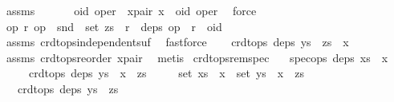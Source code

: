 \begin{isabellebody}
%
\isadelimproof
%
\endisadelimproof
%
\isatagproof
{}\isamarkupfalse%
\ assms\ \isamarkupfalse%
\ {\isacharminus}\isanewline
\ \ \isamarkupfalse%
\ oid\ oper\ \ x{\isacharunderscore}pair{\isacharcolon}\ {\isachardoublequoteopen}x\ {\isacharequal}\ {\isacharparenleft}oid{\isacharcomma}\ oper{\isacharparenright}{\isachardoublequoteclose}\ \isamarkupfalse%
\ force\isanewline
\ \ \isamarkupfalse%
\ {\isachardoublequoteopen}{\isasymAnd}op{}\ r{\isachardot}\ op{}\ {\isasymin}\ snd\ {\isacharbackquote}\ set\ zs\ {\isasymLongrightarrow}\ r\ {\isasymin}\ deps\ op{}\ {\isasymLongrightarrow}\ r\ {\isasymnoteq}\ oid{\isachardoublequoteclose}\isanewline
\ \ \ \ \isamarkupfalse%
\ assms\ crdt{\isacharunderscore}ops{\isacharunderscore}independent{\isacharunderscore}suf\ \isamarkupfalse%
\ fastforce\isanewline
\ \ \isamarkupfalse%
\ {\isachardoublequoteopen}crdt{\isacharunderscore}ops\ deps\ {\isacharparenleft}ys\ {\isacharat}\ zs\ {\isacharat}\ {\isacharbrackleft}x{\isacharbrackright}{\isacharparenright}{\isachardoublequoteclose}\isanewline
\ \ \ \ \isamarkupfalse%
\ assms{\isacharparenleft}{}{\isacharparenright}\ crdt{\isacharunderscore}ops{\isacharunderscore}reorder\ x{\isacharunderscore}pair\ \isamarkupfalse%
\ metis\isanewline
{}\isamarkupfalse%
%
\endisatagproof
{\isafoldproof}%
%
\isadelimproof
\isanewline
%
\endisadelimproof
\isanewline
{}\isamarkupfalse%
\ crdt{\isacharunderscore}ops{\isacharunderscore}rem{\isacharunderscore}spec{\isacharcolon}\isanewline
\ \ \ {\isachardoublequoteopen}spec{\isacharunderscore}ops\ deps\ {\isacharparenleft}xs\ {\isacharat}\ {\isacharbrackleft}x{\isacharbrackright}{\isacharparenright}{\isachardoublequoteclose}\isanewline
\ \ \ \ \ {\isachardoublequoteopen}crdt{\isacharunderscore}ops\ deps\ {\isacharparenleft}ys\ {\isacharat}\ {\isacharbrackleft}x{\isacharbrackright}\ {\isacharat}\ zs{\isacharparenright}{\isachardoublequoteclose}\isanewline
\ \ \ \ \ {\isachardoublequoteopen}set\ {\isacharparenleft}xs\ {\isacharat}\ {\isacharbrackleft}x{\isacharbrackright}{\isacharparenright}\ {\isacharequal}\ set\ {\isacharparenleft}ys\ {\isacharat}\ {\isacharbrackleft}x{\isacharbrackright}\ {\isacharat}\ zs{\isacharparenright}{\isachardoublequoteclose}\isanewline
\ \ \ {\isachardoublequoteopen}crdt{\isacharunderscore}ops\ deps\ {\isacharparenleft}ys\ {\isacharat}\ zs{\isacharparenright}{\isachardoublequoteclose}\isanewline

\end{isabellebody}
